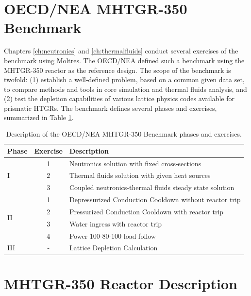 \section{OECD/NEA MHTGR-350 Benchmark}
\label{sec:ch3-bench}

Chapters \ref{ch:neutronics} and \ref{ch:thermalfluids} conduct several exercises of the benchmark \cite{oecd_nea_benchmark_2017} using Moltres.
The \gls{OECD}/\gls{NEA} defined such a benchmark using the \gls{MHTGR}-350 reactor \cite{silady_licensing_1988} as the reference design.
The scope of the benchmark is twofold: (1) establish a well-defined problem, based on a common given data set, to compare methods and tools in core simulation and thermal fluids analysis, and (2) test the depletion capabilities of various lattice physics codes available for prismatic HTGRs.
The benchmark defines several phases and exercises, summarized in Table \ref{tab:benchmark}.

\begin{table}[htbp!]
  \centering
  \caption{Description of the OECD/NEA MHTGR-350 Benchmark phases and exercises.}
  \begin{tabular}{lcl}
\toprule
Phase               & Exercise & Description                                             \\
\midrule
\multirow{3}{*}{I}  & 1        & Neutronics solution with fixed cross-sections           \\
                    & 2        & Thermal fluids solution with given heat sources         \\
                    & 3        & Coupled neutronics-thermal fluids steady state solution \\
\midrule
\multirow{4}{*}{II} & 1        & Depressurized Conduction Cooldown without reactor trip  \\
                    & 2        & Pressurized Conduction Cooldown with reactor trip       \\
                    & 3        & Water ingress with reactor trip                         \\
                    & 4        & Power 100-80-100 load follow                            \\
\midrule
III                 & -        & Lattice Depletion Calculation                           \\
\bottomrule
  \end{tabular}
  \label{tab:benchmark}
\end{table}

\section{MHTGR-350 Reactor Description}
\label{sec:ch3-mhtgr}

